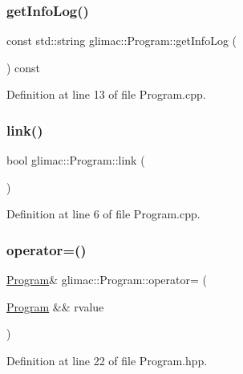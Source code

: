 \subsubsection{\texorpdfstring{get\+Info\+Log()}{getInfoLog()}}
{\footnotesize\ttfamily const std\+::string glimac\+::\+Program\+::get\+Info\+Log (\begin{DoxyParamCaption}{ }\end{DoxyParamCaption}) const}



Definition at line 13 of file Program.\+cpp.

\mbox{\label{classglimac_1_1_program_a2f32f4f66ff9742750418f6fda054931}} 
\subsubsection{\texorpdfstring{link()}{link()}}
{\footnotesize\ttfamily bool glimac\+::\+Program\+::link (\begin{DoxyParamCaption}{ }\end{DoxyParamCaption})}



Definition at line 6 of file Program.\+cpp.

\mbox{\label{classglimac_1_1_program_a3ee1eac00a2e3fa4b6bab51d4333f33c}} 
\subsubsection{\texorpdfstring{operator=()}{operator=()}}
{\footnotesize\ttfamily \hyperlink{classglimac_1_1_program}{Program}\& glimac\+::\+Program\+::operator= (\begin{DoxyParamCaption}\item[{\hyperlink{classglimac_1_1_program}{Program} \&\&}]{rvalue }\end{DoxyParamCaption})\hspace{0.3cm}{\ttfamily [inline]}}



Definition at line 22 of file Program.\+hpp.

\mbox{\label{classglimac_1_1_program_a825cb4d58cccdf849730191ae5e118c6}} 

